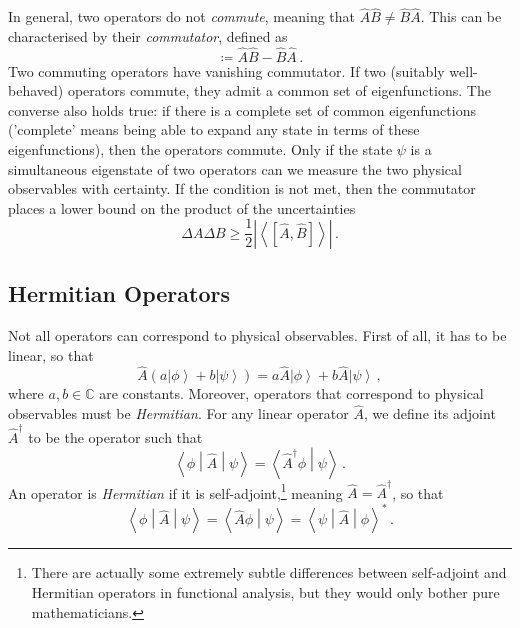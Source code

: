 \documentclass{article}
\theoremstyle{plain}\theoremheaderfont{\normalfont\itshape}\theorembodyfont{\rmfamily}\theoremseparator{.}\newtheorem*{rem}{Remark}\newtheorem*{ex}{Example}\newtheorem*{proof}{Proof}\newtheorem*{altp}{Alternative proof}
\theoremstyle{plain}\theoremheaderfont{\normalfont\bfseries}\theorembodyfont{\rmfamily}\theoremseparator{.}\newtheorem{thm}{Theorem}[section]\newtheorem{lem}[thm]{Lemma}\newtheorem{prop}[thm]{Proposition}\newtheorem*{cor}{Corollary}\newtheorem{defn}[thm]{Definition}\newtheorem{clm}[thm]{Claim}\newtheorem{clminproof}{Claim}
\theoremstyle{break}\theoremheaderfont{\normalfont\itshape}\theorembodyfont{\rmfamily}\theoremseparator{.\medskip}\newtheorem*{proofskip}{Proof}\newtheorem*{exs}{Examples}\newtheorem*{rems}{Remarks}
\theoremstyle{break}\theoremheaderfont{\normalfont\bfseries}\theorembodyfont{\rmfamily}\theoremseparator{.\medskip}\newtheorem{lemskip}[thm]{Lemma}\newtheorem{defnskip}[thm]{Definition}\newtheorem{propskip}[thm]{Proposition}\newtheorem{thmskip}[thm]{Theorem}
\numberwithin{equation}{section}
\newcommand{\ket}[1]{\left| #1 \right\rangle}
\newcommand{\braket}[2]{\left\langle #1 \middle| #2 \right\rangle}
\newcommand{\mel}[3]{\left\langle #1 \middle| #2 \middle| #3 \right\rangle}
\newcommand{\eval}[1]{\left\langle #1 \right\rangle}
\newcommand{\abs}[1]{\left| #1 \right|}
\newcommand{\CC}{\mathbb{C}}
\begin{document}
    In general, two operators do not \textit{commute}, meaning that \(\hat{A}\hat{B}\ne\hat{B}\hat{A}\). This can be characterised by their \textit{commutator}, defined as
    \begin{equation}
        [\hat{A},\hat{B}]\coloneqq\hat{A}\hat{B}-\hat{B}\hat{A}\,.
    \end{equation}
    Two commuting operators have vanishing commutator. If two (suitably well-behaved) operators commute, they admit a common set of eigenfunctions. The converse also holds true: if there is a complete set of common eigenfunctions ('complete' means being able to expand any state in terms of these eigenfunctions), then the operators commute. Only if the state \(\psi\) is a simultaneous eigenstate of two operators can we measure the two physical observables with certainty. If the condition is not met, then the commutator places a lower bound on the product of the uncertainties
    \begin{equation}
        \Delta A\Delta B\ge\frac{1}{2}\abs{\eval{[\hat{A},\hat{B}]}}\,.
    \end{equation}

    \subsection{Hermitian Operators}
    Not all operators can correspond to physical observables. First of all, it has to be linear, so that
    \begin{equation}
        \hat{A}(a\ket{\phi}+b\ket{\psi})=a\hat{A}\ket{\phi}+b\hat{A}\ket{\psi}\,,
    \end{equation}
    where \(a,b\in\CC\) are constants. Moreover, operators that correspond to physical observables must be \textit{Hermitian}. For any linear operator \(\hat{A}\), we define its adjoint \(\hat{A}^\dagger\) to be the operator such that
    \begin{equation}
        \mel{\phi}{\hat{A}}{\psi}=\braket{\hat{A}^\dagger\phi}{\psi}\,.
    \end{equation}
    An operator is \textit{Hermitian} if it is self-adjoint,\footnote{There are actually some extremely subtle differences between self-adjoint and Hermitian operators in functional analysis, but they would only bother pure mathematicians.} meaning \(\hat{A}=\hat{A}^\dagger\), so that
    \begin{equation}
        \mel{\phi}{\hat{A}}{\psi}=\braket{\hat{A}\phi}{\psi}=\mel{\psi}{\hat{A}}{\phi}^*\,.
    \end{equation}
\end{document}
